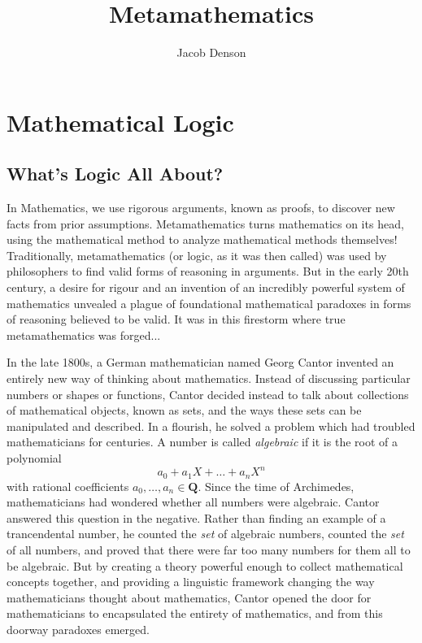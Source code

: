 

\title{Metamathematics}
\author{Jacob Denson}



\maketitle
\tableofcontents

\part{Mathematical Logic}

\chapter{What's Logic All About?}


In Mathematics, we use rigorous arguments, known as proofs, to discover new facts from prior assumptions. Metamathematics turns mathematics on its head, using the mathematical method to analyze mathematical methods themselves! Traditionally, metamathematics (or logic, as it was then called) was used by philosophers to find valid forms of reasoning in arguments. But in the early 20th century, a desire for rigour and an invention of an incredibly powerful system of mathematics unvealed a plague of foundational mathematical paradoxes in forms of reasoning believed to be valid. It was in this firestorm where true metamathematics was forged...

In the late 1800s, a German mathematician named Georg Cantor invented an entirely new way of thinking about mathematics. Instead of discussing particular numbers or shapes or functions, Cantor decided instead to talk about collections of mathematical objects, known as sets, and the ways these sets can be manipulated and described. In a flourish, he solved a problem which had troubled mathematicians for centuries. A number is called {\it algebraic} if it is the root of a polynomial
%
\[ a_0 + a_1 X + \dots + a_n X^n \]
%
with rational coefficients $a_0, \dots, a_n \in \mathbf{Q}$.  Since the time of Archimedes, mathematicians had wondered whether all numbers were algebraic. Cantor answered this question in the negative. Rather than finding an example of a trancendental number, he counted the {\it set} of algebraic numbers, counted the {\it set} of all numbers, and proved that there were far too many numbers for them all to be algebraic. But by creating a theory powerful enough to collect mathematical concepts together, and providing a linguistic framework changing the way mathematicians thought about mathematics, Cantor opened the door for mathematicians to encapsulated the entirety of mathematics, and from this doorway paradoxes emerged.

